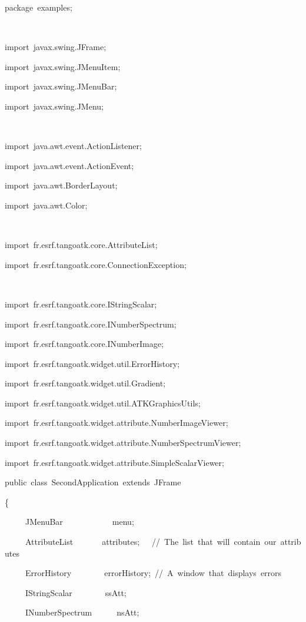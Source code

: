 
\begin{lyxcode}
package~examples;

~



import~javax.swing.JFrame;

import~javax.swing.JMenuItem;

import~javax.swing.JMenuBar;

import~javax.swing.JMenu;

~



import~java.awt.event.ActionListener;

import~java.awt.event.ActionEvent;

import~java.awt.BorderLayout;

import~java.awt.Color;

~



import~fr.esrf.tangoatk.core.AttributeList;

import~fr.esrf.tangoatk.core.ConnectionException;

~

import~fr.esrf.tangoatk.core.IStringScalar;

import~fr.esrf.tangoatk.core.INumberSpectrum;

import~fr.esrf.tangoatk.core.INumberImage;

import~fr.esrf.tangoatk.widget.util.ErrorHistory;

import~fr.esrf.tangoatk.widget.util.Gradient;

import~fr.esrf.tangoatk.widget.util.ATKGraphicsUtils;

import~fr.esrf.tangoatk.widget.attribute.NumberImageViewer;

import~fr.esrf.tangoatk.widget.attribute.NumberSpectrumViewer;

import~fr.esrf.tangoatk.widget.attribute.SimpleScalarViewer;



public~class~SecondApplication~extends~JFrame

\{

~~~~~JMenuBar~~~~~~~~~~~~menu;

~~~~~AttributeList~~~~~~~attributes;~~~//~The~list~that~will~contain~our~attributes

~~~~~ErrorHistory~~~~~~~~errorHistory;~//~A~window~that~displays~errors

~~~~~IStringScalar~~~~~~~~ssAtt;

~~~~~INumberSpectrum~~~~~~nsAtt;


\end{lyxcode}
